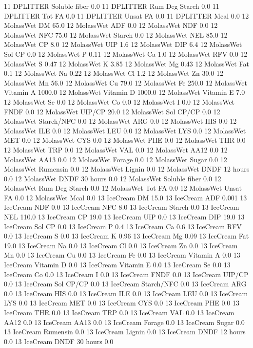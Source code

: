 \documentclass[letterpaper,10pt,english]{sphinxmanual}
\begin{document}
\begin{sphinxVerbatim}[commandchars=\\\{\},numbers=left,firstnumber=1,stepnumber=1]
11 DPLITTER Soluble fiber 0.0
11 DPLITTER Rum Deg Starch 0.0
11 DPLITTER Tot FA 0.0
11 DPLITTER Unsat FA 0.0
11 DPLITTER Mcal 0.0
12 MolassWet DM 65.0
12 MolassWet ADF 0.0
12 MolassWet NDF 0.0
12 MolassWet NFC 75.0
12 MolassWet Starch 0.0
12 MolassWet NEL 85.0
12 MolassWet CP 8.0
12 MolassWet UIP 1.6
12 MolassWet DIP 6.4
12 MolassWet Sol CP 0.0
12 MolassWet P 0.11
12 MolassWet Ca 1.0
12 MolassWet RFV 0.0
12 MolassWet S 0.47
12 MolassWet K 3.85
12 MolassWet Mg 0.43
12 MolassWet Fat 0.1
12 MolassWet Na 0.22
12 MolassWet Cl 1.2
12 MolassWet Zn 30.0
12 MolassWet Mn 56.0
12 MolassWet Cu 79.0
12 MolassWet Fe 250.0
12 MolassWet Vitamin A 1000.0
12 MolassWet Vitamin D 1000.0
12 MolassWet Vitamin E 7.0
12 MolassWet Se 0.0
12 MolassWet Co 0.0
12 MolassWet I 0.0
12 MolassWet FNDF 0.0
12 MolassWet UIP/CP 20.0
12 MolassWet Sol CP/CP 0.0
12 MolassWet Starch/NFC 0.0
12 MolassWet ARG 0.0
12 MolassWet HIS 0.0
12 MolassWet ILE 0.0
12 MolassWet LEU 0.0
12 MolassWet LYS 0.0
12 MolassWet MET 0.0
12 MolassWet CYS 0.0
12 MolassWet PHE 0.0
12 MolassWet THR 0.0
12 MolassWet TRP 0.0
12 MolassWet VAL 0.0
12 MolassWet AA\PYGZsh{}12 0.0
12 MolassWet AA\PYGZsh{}13 0.0
12 MolassWet \PYGZpc{} Forage 0.0
12 MolassWet Sugar \PYGZpc{} 0.0
12 MolassWet Rumensin 0.0
12 MolassWet Lignin 0.0
12 MolassWet DNDF 12 hours 0.0
12 MolassWet DNDF 30 hours 0.0
12 MolassWet Soluble fiber 0.0
12 MolassWet Rum Deg Starch 0.0
12 MolassWet Tot FA 0.0
12 MolassWet Unsat FA 0.0
12 MolassWet Mcal 0.0
13 IceCream DM 15.0
13 IceCream ADF 0.001
13 IceCream NDF 0.0
13 IceCream NFC \PYGZhy{}8.0
13 IceCream Starch 0.0
13 IceCream NEL 110.0
13 IceCream CP 19.0
13 IceCream UIP 0.0
13 IceCream DIP 19.0
13 IceCream Sol CP 0.0
13 IceCream P 0.4
13 IceCream Ca 0.6
13 IceCream RFV 0.0
13 IceCream S 0.0
13 IceCream K 0.96
13 IceCream Mg 0.09
13 IceCream Fat 19.0
13 IceCream Na 0.0
13 IceCream Cl 0.0
13 IceCream Zn 0.0
13 IceCream Mn 0.0
13 IceCream Cu 0.0
13 IceCream Fe 0.0
13 IceCream Vitamin A 0.0
13 IceCream Vitamin D 0.0
13 IceCream Vitamin E 0.0
13 IceCream Se 0.0
13 IceCream Co 0.0
13 IceCream I 0.0
13 IceCream FNDF 0.0
13 IceCream UIP/CP 0.0
13 IceCream Sol CP/CP 0.0
13 IceCream Starch/NFC 0.0
13 IceCream ARG 0.0
13 IceCream HIS 0.0
13 IceCream ILE 0.0
13 IceCream LEU 0.0
13 IceCream LYS 0.0
13 IceCream MET 0.0
13 IceCream CYS 0.0
13 IceCream PHE 0.0
13 IceCream THR 0.0
13 IceCream TRP 0.0
13 IceCream VAL 0.0
13 IceCream AA\PYGZsh{}12 0.0
13 IceCream AA\PYGZsh{}13 0.0
13 IceCream \PYGZpc{} Forage 0.0
13 IceCream Sugar \PYGZpc{} 0.0
13 IceCream Rumensin 0.0
13 IceCream Lignin 0.0
13 IceCream DNDF 12 hours 0.0
13 IceCream DNDF 30 hours 0.0

\end{sphinxVerbatim}
\end{document}
